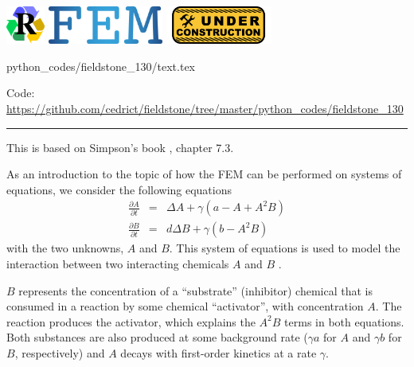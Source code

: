\includegraphics[height=1.25cm]{images/pictograms/replication}
\includegraphics[height=1.25cm]{images/pictograms/FEM}
\includegraphics[height=1.25cm]{images/pictograms/under_construction}


\begin{flushright} {\tiny {\color{gray} python\_codes/fieldstone\_130/text.tex}} \end{flushright}

%

\begin{center}
\inpython
Code: \url{https://github.com/cedrict/fieldstone/tree/master/python_codes/fieldstone_130}
\end{center}

\par\noindent\rule{\textwidth}{0.4pt}


This is based on Simpson's book \cite{simp17}, chapter 7.3.

As an introduction to the topic of how the FEM can be
performed on systems of equations, we consider the following equations
\begin{eqnarray}
\frac{\partial A}{\partial t} &=& \Delta A  + \gamma (a-A+A^2B) \\
\frac{\partial B}{\partial t} &=& d \Delta B  + \gamma (b-A^2B) 
\end{eqnarray}
with the two unknowns, $A$ and $B$. This system of equations is used to model the interaction between
two interacting chemicals $A$ and $B$ \cite{mawb12}.

$B$ represents the concentration of a ``substrate'' (inhibitor) chemical 
that is consumed in a reaction by some chemical ``activator'',
with concentration $A$. The reaction produces the activator, which explains 
the $A^2B$ terms in both equations. Both substances are also produced 
at some background rate ($\gamma a$ for $A$ and $\gamma b$ for $B$,
respectively) and $A$ decays with first-order kinetics at a rate $\gamma$.


